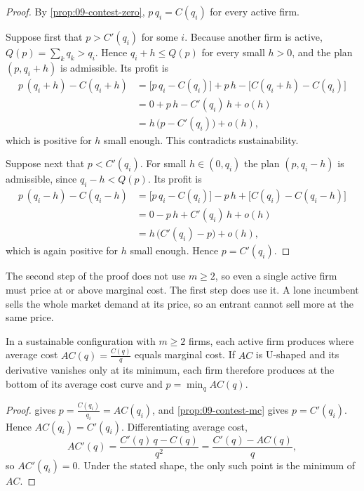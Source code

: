 \begin{proof}
By \cref{prop:09-contest-zero}, $p\,q_i = C(q_i)$ for every active firm.

Suppose first that $p > C'(q_i)$ for some $i$. Because another firm is active, $Q(p) = \sum_k q_k > q_i$.
Hence $q_i + h \le Q(p)$ for every small $h > 0$, and the plan $(p, q_i + h)$ is admissible. Its profit is
\begin{align*}
  p\,(q_i + h) - C(q_i + h)
  &= \big[p\,q_i - C(q_i)\big] + p\,h - \big[C(q_i + h) - C(q_i)\big] \\
  &= 0 + p\,h - C'(q_i)\,h + o(h) \\
  &= h\,\big(p - C'(q_i)\big) + o(h),
\end{align*}
which is positive for $h$ small enough. This contradicts sustainability.

Suppose next that $p < C'(q_i)$. For small $h \in (0, q_i)$ the plan $(p, q_i - h)$ is admissible, since
$q_i - h < Q(p)$. Its profit is
\begin{align*}
  p\,(q_i - h) - C(q_i - h)
  &= \big[p\,q_i - C(q_i)\big] - p\,h + \big[C(q_i) - C(q_i - h)\big] \\
  &= 0 - p\,h + C'(q_i)\,h + o(h) \\
  &= h\,\big(C'(q_i) - p\big) + o(h),
\end{align*}
which is again positive for $h$ small enough. Hence $p = C'(q_i)$.
\end{proof}

The second step of the proof does not use $m \ge 2$, so even a single active firm must price at or above
marginal cost. The first step does use it. A lone incumbent sells the whole market demand at its price, so an
entrant cannot sell more at the same price.

\begin{corollary}\label{cor:09-contest-scale}
In a sustainable configuration with $m \ge 2$ firms, each active firm produces where average cost
$AC(q) = \frac{C(q)}{q}$ equals marginal cost. If $AC$ is U-shaped and its derivative vanishes only at its
minimum, each firm therefore produces at the bottom of its average cost curve and $p = \min_q AC(q)$.
\end{corollary}

\begin{proof}
 gives $p = \frac{C(q_i)}{q_i} = AC(q_i)$, and \cref{prop:09-contest-mc} gives
$p = C'(q_i)$. Hence $AC(q_i) = C'(q_i)$. Differentiating average cost,
\begin{equation*}
  AC'(q) = \frac{C'(q)\,q - C(q)}{q^2} = \frac{C'(q) - AC(q)}{q},
\end{equation*}
so $AC'(q_i) = 0$. Under the stated shape, the only such point is the minimum of $AC$.
\end{proof}

